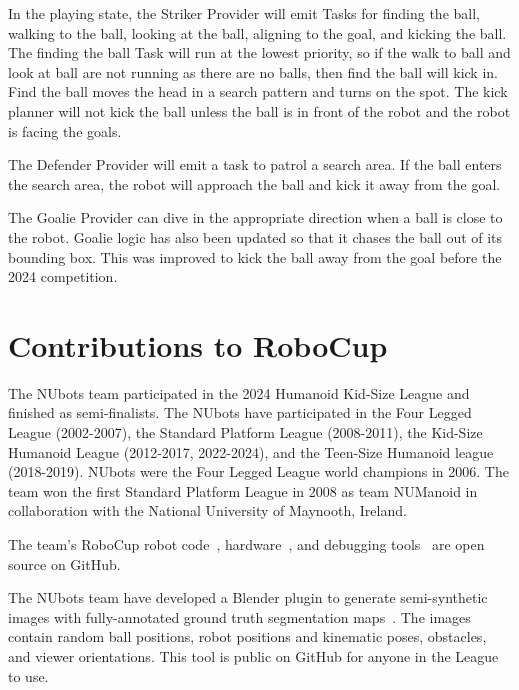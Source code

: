 \documentclass{llncs}
\begin{document}
In the playing state, the Striker Provider will emit Tasks for finding the ball, walking to the ball, looking at the ball, aligning to the goal, and kicking the ball. The finding the ball Task will run at the lowest priority, so if the walk to ball and look at ball are not running as there are no balls, then find the ball will kick in. Find the ball moves the head in a search pattern and turns on the spot. The kick planner will not kick the ball unless the ball is in front of the robot and the robot is facing the goals. 

The Defender Provider will emit a task to patrol a search area. If the ball enters the search area, the robot will approach the ball and kick it away from the goal.

The Goalie Provider can dive in the appropriate direction when a ball is close to the robot. Goalie logic has also been updated so that it chases the ball out of its bounding box. This was improved to kick the ball away from the goal before the 2024 competition.

\medskip

\section{Contributions to RoboCup}


The NUbots team participated in the 2024 Humanoid Kid-Size League and finished as semi-finalists. The NUbots have participated in the Four Legged League (2002-2007), the Standard Platform League (2008-2011), the Kid-Size Humanoid League (2012-2017, 2022-2024), and the Teen-Size Humanoid league (2018-2019). NUbots were the Four Legged League world champions in 2006. The team won the first Standard Platform League in 2008 as team NUManoid in collaboration with the National University of Maynooth, Ireland.

The team's RoboCup robot code~\cite{nubotsGit}, hardware~\cite{nubotsHardwareGit}, and debugging tools~\cite{nubotsNUsightGit} are open source on GitHub. 

The NUbots team have developed a Blender plugin to generate semi-synthetic images with fully-annotated ground truth segmentation maps~\cite{nubotsNUpbrGit}. The images contain random ball positions, robot positions and kinematic poses, obstacles, and viewer orientations. This tool is public on GitHub for anyone in the League to use.
\end{document}
